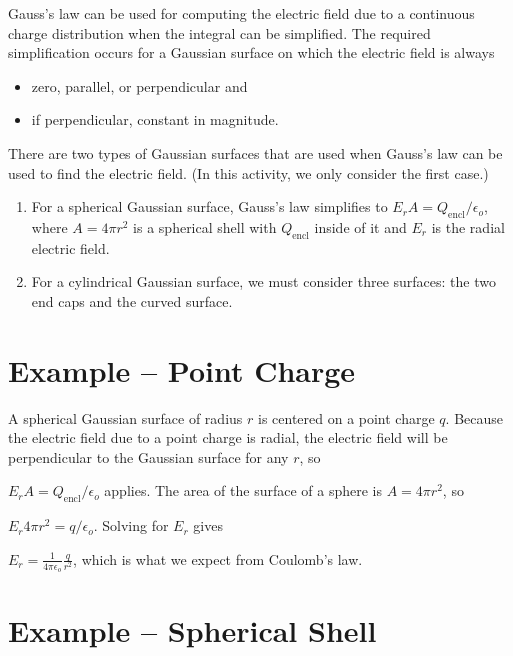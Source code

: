 \documentclass{article}
\newcommand{\ds}[0]{\displaystyle}
\begin{document}
Gauss's law can be used for computing the electric field due to a continuous charge distribution when the integral can be simplified. The required simplification occurs for a Gaussian surface on which the electric field is always

\begin{itemize}

  \item zero, parallel, or perpendicular and

  \item if perpendicular, constant in magnitude.

\end{itemize}

There are two types of Gaussian surfaces that are used when Gauss's law can be used to find the electric field. (In this activity, we only consider the first case.)

\begin{enumerate}

  \item For a spherical Gaussian surface, Gauss's law simplifies to $\ds E_rA = {Q_{\text{encl}}}/{\epsilon_o}$, where $A=4\pi r^2$ is a spherical shell with $Q_{\text{encl}}$ inside of it and $E_r$ is the radial electric field.

  \item For a cylindrical Gaussian surface, we must consider three surfaces: the two end caps and the curved surface.

\end{enumerate}

\newpage

\section{Example -- Point Charge}

A spherical Gaussian surface of radius $r$ is centered on a point charge $q$. Because the electric field due to a point charge is radial, the electric field will be perpendicular to the Gaussian surface for any $r$, so

$\ds E_rA = {Q_{\text{encl}}}/{\epsilon_o}$ applies. The area of the surface of a sphere is $A = 4\pi r^2$, so

$\ds E_r 4\pi r^2 = {q}/{\epsilon_o}$. Solving for $E_r$ gives

$\ds E_r = \frac{1}{4\pi\epsilon_o}\frac{q}{r^2}$, which is what we expect from Coulomb's law.

\section{Example -- Spherical Shell}
\end{document}
